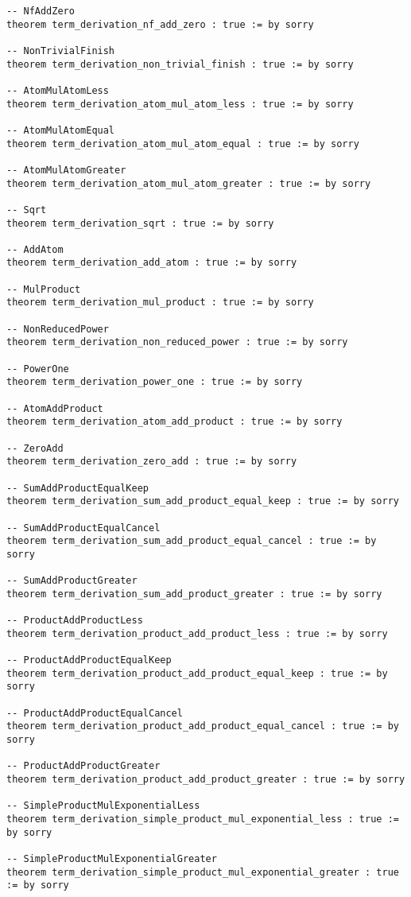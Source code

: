 \documentclass{article}
\begin{document}
\begin{tcolorbox}[colback=white!10, width=\linewidth]
\begin{lstlisting}[language=Lean4]
-- NfAddZero
theorem term_derivation_nf_add_zero : true := by sorry

-- NonTrivialFinish
theorem term_derivation_non_trivial_finish : true := by sorry

-- AtomMulAtomLess
theorem term_derivation_atom_mul_atom_less : true := by sorry

-- AtomMulAtomEqual
theorem term_derivation_atom_mul_atom_equal : true := by sorry

-- AtomMulAtomGreater
theorem term_derivation_atom_mul_atom_greater : true := by sorry

-- Sqrt
theorem term_derivation_sqrt : true := by sorry

-- AddAtom
theorem term_derivation_add_atom : true := by sorry

-- MulProduct
theorem term_derivation_mul_product : true := by sorry

-- NonReducedPower
theorem term_derivation_non_reduced_power : true := by sorry

-- PowerOne
theorem term_derivation_power_one : true := by sorry

-- AtomAddProduct
theorem term_derivation_atom_add_product : true := by sorry

-- ZeroAdd
theorem term_derivation_zero_add : true := by sorry

-- SumAddProductEqualKeep
theorem term_derivation_sum_add_product_equal_keep : true := by sorry

-- SumAddProductEqualCancel
theorem term_derivation_sum_add_product_equal_cancel : true := by sorry

-- SumAddProductGreater
theorem term_derivation_sum_add_product_greater : true := by sorry

-- ProductAddProductLess
theorem term_derivation_product_add_product_less : true := by sorry

-- ProductAddProductEqualKeep
theorem term_derivation_product_add_product_equal_keep : true := by sorry

-- ProductAddProductEqualCancel
theorem term_derivation_product_add_product_equal_cancel : true := by sorry

-- ProductAddProductGreater
theorem term_derivation_product_add_product_greater : true := by sorry

-- SimpleProductMulExponentialLess
theorem term_derivation_simple_product_mul_exponential_less : true := by sorry

-- SimpleProductMulExponentialGreater
theorem term_derivation_simple_product_mul_exponential_greater : true := by sorry


\end{lstlisting}
\end{tcolorbox}
\end{document}
